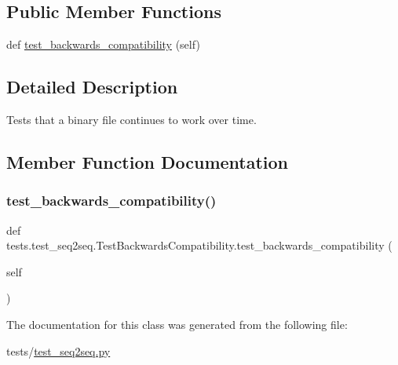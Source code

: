 \subsection*{Public Member Functions}
\begin{DoxyCompactItemize}
\item 
def \hyperlink{classtests_1_1test__seq2seq_1_1TestBackwardsCompatibility_a16dafded5f7a24b334e692873a74b74b}{test\+\_\+backwards\+\_\+compatibility} (self)
\end{DoxyCompactItemize}


\subsection{Detailed Description}
\begin{DoxyVerb}Tests that a binary file continues to work over time.
\end{DoxyVerb}
 

\subsection{Member Function Documentation}
\mbox{\label{classtests_1_1test__seq2seq_1_1TestBackwardsCompatibility_a16dafded5f7a24b334e692873a74b74b}} 
\subsubsection{\texorpdfstring{test\+\_\+backwards\+\_\+compatibility()}{test\_backwards\_compatibility()}}
{\footnotesize\ttfamily def tests.\+test\+\_\+seq2seq.\+Test\+Backwards\+Compatibility.\+test\+\_\+backwards\+\_\+compatibility (\begin{DoxyParamCaption}\item[{}]{self }\end{DoxyParamCaption})}



The documentation for this class was generated from the following file\+:\begin{DoxyCompactItemize}
\item 
tests/\hyperlink{test__seq2seq_8py}{test\+\_\+seq2seq.\+py}\end{DoxyCompactItemize}
